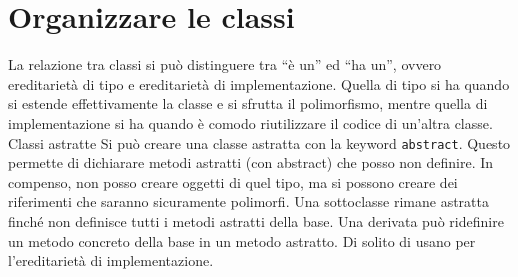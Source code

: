 \chapter{Organizzare le classi}

La relazione tra classi si può distinguere tra “è un” ed “ha un”, ovvero ereditarietà di tipo e ereditarietà di implementazione. Quella di tipo si ha quando si estende effettivamente la classe e si sfrutta il polimorfismo, mentre quella di implementazione si ha quando è comodo riutilizzare il codice di un'altra classe.
Classi astratte
Si può creare una classe astratta con la keyword \texttt{abstract}. Questo permette di dichiarare metodi astratti (con abstract) che posso non definire. In compenso, non posso creare oggetti di quel tipo, ma si possono creare dei riferimenti che saranno sicuramente polimorfi. Una sottoclasse rimane astratta finché non definisce tutti i metodi astratti della base.
Una derivata può ridefinire un metodo concreto della base in un metodo astratto.
Di solito di usano per l'ereditarietà di implementazione.

